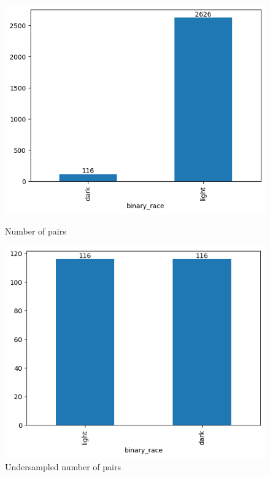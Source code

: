 \documentclass[conference]{IEEEtran}
\begin{document}
\begin{figure}[hbt!]\captionsetup[subfigure]{font=footnotesize}
  \centering
  \begin{minipage}{.4\columnwidth}
    \centering
    \includegraphics[width=\linewidth]{latex/images/NonUniformNumberOfPairings.png}
    \caption{Number of pairs}
    \label{num_pairings}
  \end{minipage}%
  \hfill
  \begin{minipage}{.4\columnwidth}
    \centering
    \includegraphics[width=\linewidth]{latex/images/UniformNumberOfPairings.png}
    \caption{Undersampled number of pairs}
    \label{num_pairings_undersampled}
  \end{minipage}%
\end{figure}
\end{document}
